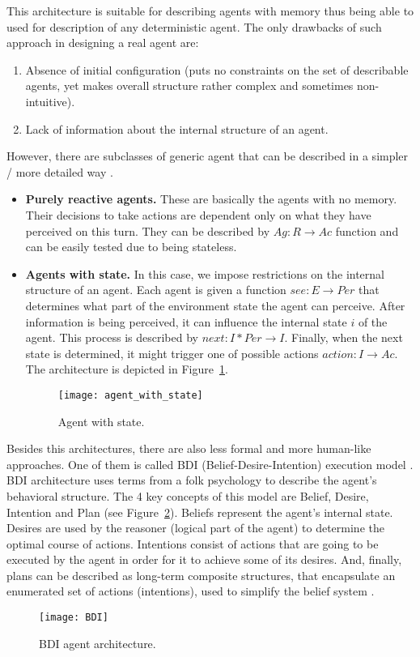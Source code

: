 This architecture is suitable for describing agents with memory thus being able to used for description of any deterministic agent.
The only drawbacks of such approach in designing a real agent are:
\begin{enumerate}
  \item Absence of initial configuration (puts no constraints on the set of describable agents, yet makes overall structure rather complex and sometimes non-intuitive).
  \item Lack of information about the internal structure of an agent.
\end{enumerate}
However, there are subclasses of generic agent that can be described in a simpler / more detailed way \cite{DUMMY:1}.
\begin{itemize}
\item \textbf{Purely reactive agents.} These are basically the agents with no memory. Their decisions to take actions are dependent only on what they have perceived on this turn. They can be described by \(Ag : R\rightarrow Ac\) function and can be easily tested due to being stateless.
\item \textbf{Agents with state.} In this case, we impose restrictions on the internal structure of an agent. Each agent is given a function \(see : E\rightarrow Per\) that determines what part of the environment state the agent can perceive. After information is being perceived, it can influence the internal state $i$ of the agent. This process is described by \(next : I*Per\rightarrow I\). Finally, when the next state is determined, it might trigger one of possible actions \(action: I\rightarrow Ac\). The architecture is depicted in Figure~\ref{StateAgent}.
    \begin{figure}[h!]
     \begin{center}
      \texttt{[image: agent\_with\_state]}
      \caption{Agent with state.}
      \label{StateAgent}
      \end{center}
    \end{figure}
\end{itemize}
Besides this architectures, there are also less formal and more human-like approaches.
One of them is called BDI (Belief-Desire-Intention) execution model \cite{DUMMY:1}.
BDI architecture uses terms from a folk psychology to describe the agent's behavioral structure. The 4 key concepts of this model are Belief, Desire, Intention and Plan (see Figure~\ref{BDIAgent}). Beliefs represent the agent's internal state. Desires are used by the reasoner (logical part of the agent) to determine the optimal course of actions. Intentions consist of actions that are going to be executed by the agent in order for it to achieve some of its desires. And, finally, plans can be described as long-term composite structures, that encapsulate an enumerated set of actions (intentions), used to simplify the belief system \cite[p.~150]{DUMMY:2}.
    \begin{figure}[h!]
      \begin{center}
      \texttt{[image: BDI]}
      \caption{BDI agent architecture.}
      \label{BDIAgent}
      \end{center}
    \end{figure}

